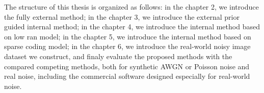 The structure of this thesis is organized as follows: in the chapter 2, we introduce the fully external method; in the chapter 3, we introduce the external prior guided internal method; in the chapter 4, we introduce the internal method based on low ran model; in the chapter 5, we introduce the internal method based on sparse coding model; in the chapter 6, we introduce the real-world noisy image dataset we construct, and finaly evaluate the proposed methods with the compared competing methods, both for synthetic AWGN or Poisson noise and real noise, including the commercial software designed especially for real-world noise. 







